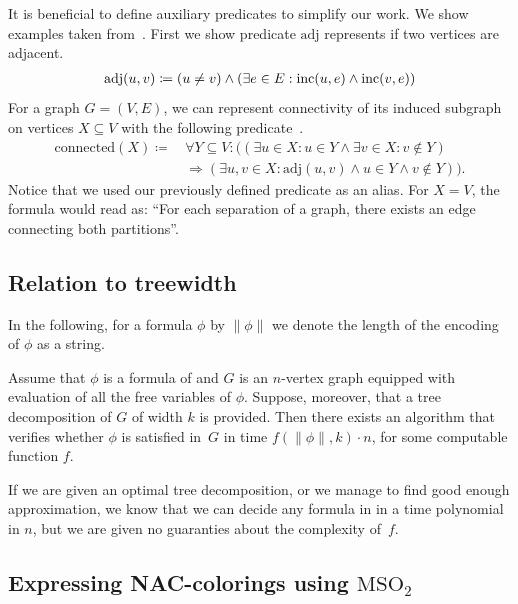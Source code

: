 It is beneficial to define auxiliary predicates to simplify our work.
We show examples taken from~\cite{book_parametrized_algorithms}.
First we show predicate \( \text{adj} \) represents if two vertices are adjacent.
%
\begin{align*}
	\text{adj}(u, v) \coloneqq (u \ne v) \land (\exists e \in E : \text{inc} (u, e) \land \text{inc} (v, e))
\end{align*}
%
For a graph \( G = (V, E) \), we can represent connectivity of its induced subgraph
on vertices \( X \subseteq V \) with the following predicate~\cite{book_parametrized_algorithms}.
%
\begin{align*}
	\text{connected}(X) \coloneqq \, &
	\forall Y \subseteq V : \Big(
	(
	\exists u \in X : u \in Y \land
	\exists v \in X : v \not\in Y
	)
	\\ &
	\Rightarrow
	(
	\exists u, v \in X : \text{adj}(u, v) \land u \in Y \land v \not\in Y
	)\Big).
\end{align*}
%
Notice that we used our previously defined predicate as an alias.
For \( X = V \), the formula would read as:
``For each separation of a graph, there exists an edge connecting both partitions''.

\subsection{Relation to treewidth}

In the following, for a formula \( \phi \) by \( \|\phi\| \)
we denote the length of the encoding of \( \phi \) as a string.
%
\begin{theorem}%
	\label{theorem:courcelles_theorem}%
	Assume that \( \phi \) is a formula of \MSO{} and
	\( G \) is an \( n \)-vertex graph equipped
	with evaluation of all the free variables of \( \phi \).
	Suppose, moreover, that a tree decomposition of \( G \) of width \( k \) is provided.
	Then there exists an algorithm that verifies whether \( \phi \)
	is satisfied in~\( G \) in time \( f (\|\phi\|, k) \cdot n \),
	for some computable function \( f \).
\end{theorem}
%
If we are given an optimal tree decomposition, or we manage to find good enough
approximation, we know that we can decide any formula in \MSO{} in a time
polynomial in \( n \), but we are given no guaranties about the complexity of~\( f \).

\subsection{Expressing NAC-colorings using \( \text{MSO}_2 \)}

